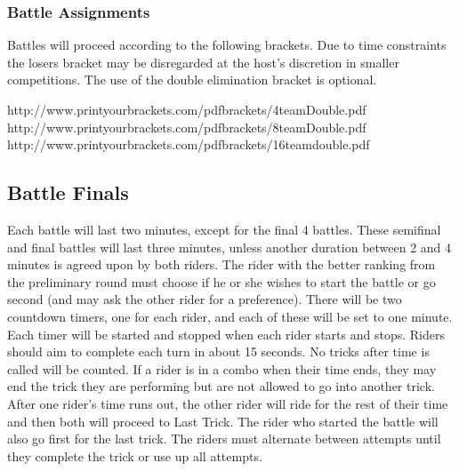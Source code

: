 \subsubsection{Battle Assignments}
Battles will proceed according to the following brackets.
Due to time constraints the losers bracket may be disregarded at the host's discretion in smaller competitions.
The use of the double elimination bracket is optional.

http://www.printyourbrackets.com/pdfbrackets/4teamDouble.pdf \\
http://www.printyourbrackets.com/pdfbrackets/8teamDouble.pdf \\
http://www.printyourbrackets.com/pdfbrackets/16teamdouble.pdf

\subsection{Battle Finals}
Each battle will last two minutes, except for the final 4 battles.
These semifinal and final battles will last three minutes, unless another duration between 2 and 4 minutes is agreed upon by both riders.
The rider with the better ranking from the preliminary round must choose if he or she wishes to start the battle or go second (and may ask the other rider for a preference).
There will be two countdown timers, one for each rider, and each of these will be set to one minute.
Each timer will be started and stopped when each rider starts and stops.
Riders should aim to complete each turn in about 15 seconds.
No tricks after time is called will be counted.
If a rider is in a combo when their time ends, they may end the trick they are performing but are not allowed to go into another trick.
After one rider's time runs out, the other rider will ride for the rest of their time and then both will proceed to Last Trick.
The rider who started the battle will also go first for the last trick.
The riders must alternate between attempts until they complete the trick or use up all attempts.
